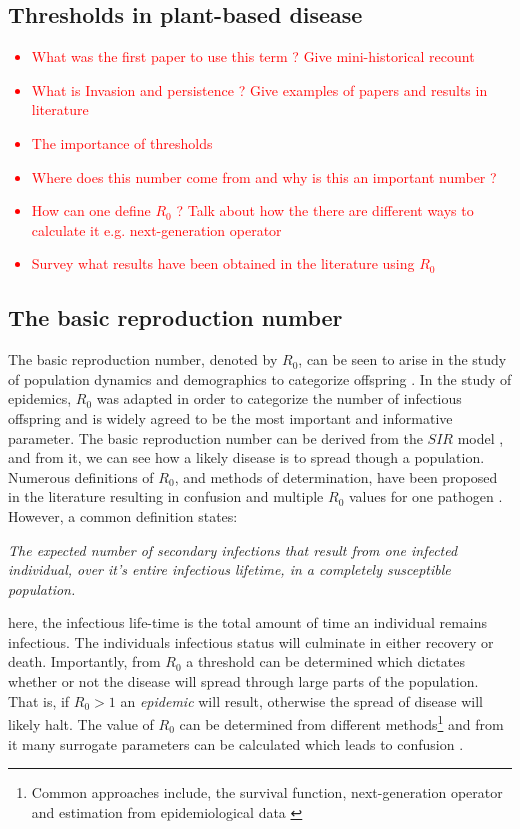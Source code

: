 \subsection{Thresholds in plant-based disease}
\textcolor{red}{
\begin{itemize}
    \item What was the first paper to use this term ? Give mini-historical recount
    \item What is Invasion and persistence ? Give examples of papers and results in literature 
    \item The importance of thresholds
    \item Where does this number come from and why is \textbf{}this an important number ?
    \item How can one define $R_0$ ? Talk about how the there are different ways to calculate it e.g. next-generation operator 
    \item Survey what results have been obtained in the literature using $R_0$
\end{itemize}}

\subsection{The basic reproduction number}
The basic reproduction number, denoted by $R_0$, can be seen to arise in the study of population dynamics and demographics to categorize offspring \cite{heesterbeek2002brief}. In the study of epidemics, $R_0$ was adapted in order to categorize the number of infectious offspring and is widely agreed to be the most important and informative parameter. The basic reproduction number can be derived from the $SIR$ model \cite{kermack-model}, and from it, we can see how a likely disease is to spread though a population. Numerous definitions of $R_0$, and methods of determination, have been proposed in the literature resulting in confusion and multiple $R_0$ values for one pathogen \cite{delamater2019complexity}. However, a common definition states:

\textit{The expected number of secondary infections that result from one infected individual, over it's entire infectious lifetime, in a completely susceptible population.}

here, the infectious life-time is the total amount of time an individual remains infectious. The individuals infectious status will culminate in either recovery or death. Importantly, from $R_0$ a threshold can be determined which dictates whether or not the disease will spread through large parts of the population. That is, if $R_0>1$ an \textit{epidemic} will result, otherwise the spread of disease will likely halt. The value of $R_0$ can be determined from different methods\footnote{Common approaches include, the survival function, next-generation operator and estimation from epidemiological data \cite{perspectives-on-r0}} and from it many surrogate parameters can be calculated which leads to confusion \cite{diekmann2010construction}.\\

